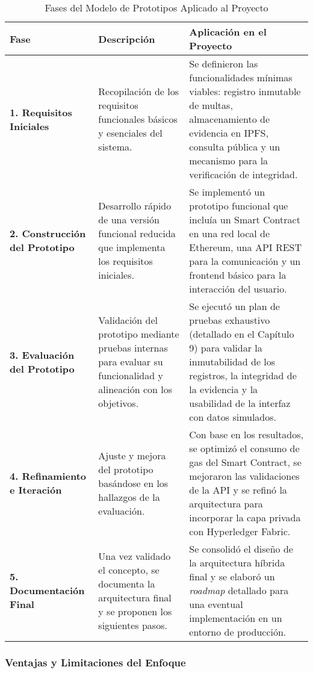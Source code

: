 \begin{table}[h]
\centering
\caption{Fases del Modelo de Prototipos Aplicado al Proyecto}
\label{tab:fases_prototipos}
\begin{tabular}{|p{3cm}|p{5cm}|p{6cm}|}
\hline
\textbf{Fase} & \textbf{Descripción} & \textbf{Aplicación en el Proyecto} \\ \hline
\textbf{1. Requisitos Iniciales} & Recopilación de los requisitos funcionales básicos y esenciales del sistema. & Se definieron las funcionalidades mínimas viables: registro inmutable de multas, almacenamiento de evidencia en IPFS, consulta pública y un mecanismo para la verificación de integridad. \\ \hline
\textbf{2. Construcción del Prototipo} & Desarrollo rápido de una versión funcional reducida que implementa los requisitos iniciales. & Se implementó un prototipo funcional que incluía un Smart Contract en una red local de Ethereum, una API REST para la comunicación y un frontend básico para la interacción del usuario. \\ \hline
\textbf{3. Evaluación del Prototipo} & Validación del prototipo mediante pruebas internas para evaluar su funcionalidad y alineación con los objetivos. & Se ejecutó un plan de pruebas exhaustivo (detallado en el Capítulo 9) para validar la inmutabilidad de los registros, la integridad de la evidencia y la usabilidad de la interfaz con datos simulados. \\ \hline
\textbf{4. Refinamiento e Iteración} & Ajuste y mejora del prototipo basándose en los hallazgos de la evaluación. & Con base en los resultados, se optimizó el consumo de gas del Smart Contract, se mejoraron las validaciones de la API y se refinó la arquitectura para incorporar la capa privada con Hyperledger Fabric. \\ \hline
\textbf{5. Documentación Final} & Una vez validado el concepto, se documenta la arquitectura final y se proponen los siguientes pasos. & Se consolidó el diseño de la arquitectura híbrida final y se elaboró un \textit{roadmap} detallado para una eventual implementación en un entorno de producción. \\ \hline
\end{tabular}
\end{table}

\subsubsection{Ventajas y Limitaciones del Enfoque}

